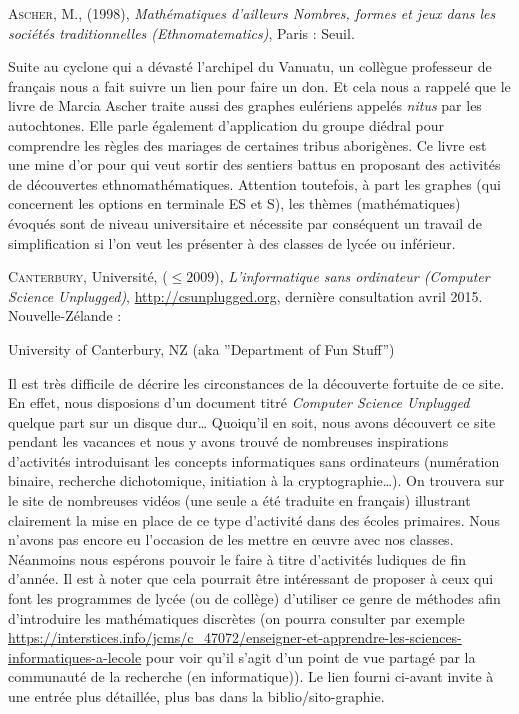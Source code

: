 \begin{thebibliography}{99}

  \textsc{Ascher}, M., (1998),
  \textit{Mathématiques d'ailleurs Nombres, formes et jeux dans les
    sociétés traditionnelles (Ethnomatematics)},
  Paris : Seuil.

  Suite au cyclone qui a dévasté l'archipel du Vanuatu, un collègue
  professeur de français nous a fait suivre un lien pour faire un
  don. Et cela nous a rappelé que le livre de Marcia Ascher traite
  aussi des graphes eulériens appelés \textit{nitus} par les
  autochtones. Elle parle également d'application du groupe diédral
  pour comprendre les règles des mariages de certaines tribus
  aborigènes. Ce livre est une mine d'or pour qui veut sortir des
  sentiers battus en proposant des activités de découvertes
  ethnomathématiques. Attention toutefois, à part les graphes (qui
  concernent les options en terminale ES et S), les thèmes
  (mathématiques) évoqués sont de niveau universitaire et nécessite
  par conséquent un travail de simplification si l'on veut les
  présenter à des classes de lycée ou inférieur.

  \textsc{Canterbury}, Université, ($\leqslant 2009$),
  \textit{L'informatique sans ordinateur (Computer Science Unplugged)},
  \url{http://csunplugged.org}, dernière consultation avril 2015.
  Nouvelle-Zélande :
  \begin{english}
    University of Canterbury, NZ (aka ''Department of Fun Stuff'')
  \end{english}

  Il est très difficile de décrire les circonstances de la découverte
  fortuite de ce site. En effet, nous disposions d'un document titré
  \textit{Computer Science Unplugged} quelque part sur un disque
  dur\dots\xspace Quoiqu'il en soit, nous avons découvert ce site
  pendant les vacances et nous y avons trouvé de nombreuses inspirations
  d'activités introduisant les concepts informatiques sans ordinateurs
  (numération binaire, recherche dichotomique, initiation à la
  cryptographie\dots). On trouvera sur le site de nombreuses vidéos
  (une seule a été traduite en français) illustrant clairement la mise
  en place de ce type d'activité dans des écoles primaires. Nous n'avons
  pas encore eu l'occasion de les mettre en \oe{}uvre avec nos
  classes. Néanmoins nous espérons pouvoir le faire à titre d'activités
  ludiques de fin d'année. Il est à noter que cela pourrait être
  intéressant de proposer à ceux qui font les programmes de lycée (ou
  de collège) d'utiliser ce genre de méthodes afin d'introduire les
  mathématiques discrètes (on pourra consulter par exemple
  \url{https://interstices.info/jcms/c_47072/enseigner-et-apprendre-les-sciences-informatiques-a-lecole}
  pour voir qu'il s'agit d'un point de vue partagé par la communauté
  de la recherche (en informatique)). Le lien fourni ci-avant invite à
  une entrée plus détaillée, plus bas dans la biblio/sito-graphie.


\end{thebibliography}
